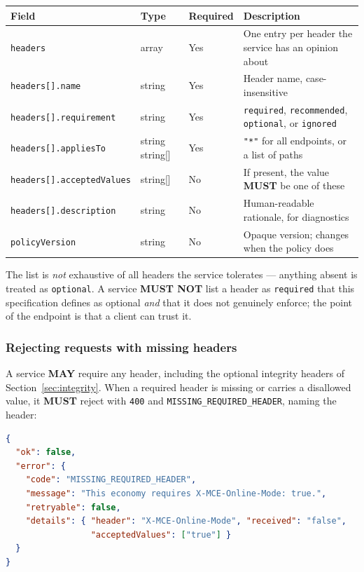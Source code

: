 \documentclass[11pt,a4paper]{article}
\newcommand{\code}[1]{\texttt{\small #1}}
\newcommand{\req}{\textbf{MUST}}
\newcommand{\opt}{\textbf{MAY}}
\begin{document}
\begin{tabularx}{\linewidth}{L{4.4cm} L{2.6cm} L{1.6cm} X}
\toprule
\textbf{Field} & \textbf{Type} & \textbf{Required} & \textbf{Description}\\
\midrule
\code{headers}                 & array    & Yes & One entry per header the service has an opinion about\\
\code{headers[].name}          & string   & Yes & Header name, case-insensitive\\
\code{headers[].requirement}   & string   & Yes & \code{required}, \code{recommended}, \code{optional}, or \code{ignored}\\
\code{headers[].appliesTo}     & string \textbar{} string[] & Yes & \code{"*"} for all endpoints, or a list of paths\\
\code{headers[].acceptedValues}& string[]  & No  & If present, the value \req{} be one of these\\
\code{headers[].description}   & string   & No  & Human-readable rationale, for diagnostics\\
\code{policyVersion}           & string   & No  & Opaque version; changes when the policy does\\
\bottomrule
\end{tabularx}

The list is \emph{not} exhaustive of all headers the service tolerates --- anything absent is
treated as \code{optional}. A service \textbf{MUST NOT} list a header as \code{required} that this
specification defines as optional \emph{and} that it does not genuinely enforce; the point of the
endpoint is that a client can trust it.

\subsubsection*{Rejecting requests with missing headers}

A service \opt{} require any header, including the optional integrity headers of
Section~\ref{sec:integrity}. When a required header is missing or carries a disallowed value, it
\req{} reject with \code{400} and \code{MISSING\_REQUIRED\_HEADER}, naming the header:

\begin{lstlisting}[language=json]
{
  "ok": false,
  "error": {
    "code": "MISSING_REQUIRED_HEADER",
    "message": "This economy requires X-MCE-Online-Mode: true.",
    "retryable": false,
    "details": { "header": "X-MCE-Online-Mode", "received": "false",
                 "acceptedValues": ["true"] }
  }
}
\end{lstlisting}
\end{document}
